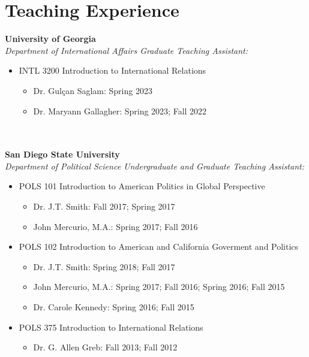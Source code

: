 \documentclass[letterpaper,12pt]{article}
\begin{document}
\section{Teaching Experience}
\textbf{University of Georgia}\\
\textit{Department of International Affairs Graduate Teaching Assistant:}\\
\begin{minipage}[t]{\linewidth}
\begin{itemize}
    \item INTL 3200 Introduction to International Relations
        \begin{itemize}
            \item Dr. Gulçan Saglam: Spring 2023
            \item Dr. Maryann Gallagher: Spring 2023; Fall 2022
        \end{itemize}
\end{itemize}
\end{minipage}
\\
\\
\textbf{San Diego State University}\\
\textit{Department of Political Science Undergraduate and Graduate Teaching Assistant:}\\
\begin{minipage}[t]{\linewidth}
\begin{itemize}
    \item POLS 101 Introduction to American Politics in Global Perspective
        \begin{itemize}
            \item Dr. J.T. Smith: Fall 2017; Spring 2017
            \item John Mercurio, M.A.: Spring 2017; Fall 2016
        \end{itemize}
    \item POLS 102 Introduction to American and California Goverment and Politics
        \begin{itemize}
            \item Dr. J.T. Smith: Spring 2018; Fall 2017
            \item John Mercurio, M.A.: Spring 2017; Fall 2016; Spring 2016; Fall 2015
            \item Dr. Carole Kennedy: Spring 2016; Fall 2015
        \end{itemize}
    \item POLS 375 Introduction to International Relations
        \begin{itemize}
            \item Dr. G. Allen Greb: Fall 2013; Fall 2012
        \end{itemize}
\end{itemize}
\end{minipage}
\end{document}
